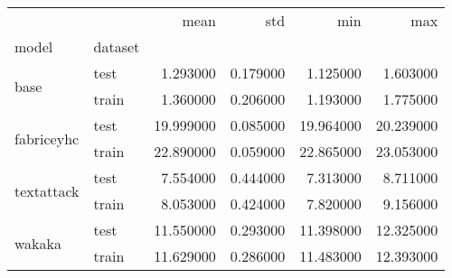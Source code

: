 \begin{tabular}{llrrrr}
 &  & mean & std & min & max \\
model & dataset &  &  &  &  \\
\multirow[c]{2}{*}{base} & test & 1.293000 & 0.179000 & 1.125000 & 1.603000 \\
 & train & 1.360000 & 0.206000 & 1.193000 & 1.775000 \\
\multirow[c]{2}{*}{fabriceyhc} & test & 19.999000 & 0.085000 & 19.964000 & 20.239000 \\
 & train & 22.890000 & 0.059000 & 22.865000 & 23.053000 \\
\multirow[c]{2}{*}{textattack} & test & 7.554000 & 0.444000 & 7.313000 & 8.711000 \\
 & train & 8.053000 & 0.424000 & 7.820000 & 9.156000 \\
\multirow[c]{2}{*}{wakaka} & test & 11.550000 & 0.293000 & 11.398000 & 12.325000 \\
 & train & 11.629000 & 0.286000 & 11.483000 & 12.393000 \\
\end{tabular}

